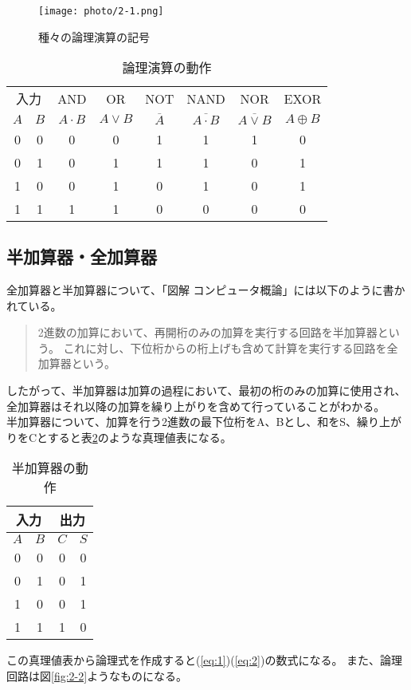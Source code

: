 \documentclass[dvipdfmx]{jsarticle}
\begin{document}
\begin{figure}[hbtp]
  \begin{center}
    \texttt{[image: photo/2-1.png]}
  \end{center}
  \caption{種々の論理演算の記号}
  \label{fig:2-1}
\end{figure}

\begin{table}[hbtp]
  \caption{論理演算の動作}
  \centering
  \begin{tabular}{|cc||c|c|c|c|c|c|} \hline
    \multicolumn{2}{|c||}{入力} & AND & OR & NOT & NAND & NOR & EXOR \\
    $A$ & $B$ & $A \cdot B$ & $A \vee B$ & $\overline{A}$ & $\overline{A \cdot B}$ & $\overline{A \vee B}$ & $A \oplus B$ \\ \hline
    0 & 0 & 0 & 0 & 1 & 1 & 1 & 0 \\ \hline
    0 & 1 & 0 & 1 & 1 & 1 & 0 & 1 \\ \hline
    1 & 0 & 0 & 1 & 0 & 1 & 0 & 1 \\ \hline
    1 & 1 & 1 & 1 & 0 & 0 & 0 & 0 \\ \hline
  \end{tabular}
  \label{tb:2-1}
\end{table}

\subsection{半加算器・全加算器}
全加算器と半加算器について、「図解 コンピュータ概論」\cite[p.98]{computer}には以下のように書かれている。
\begin{quote}
  2進数の加算において、再開桁のみの加算を実行する回路を半加算器という。
  これに対し、下位桁からの桁上げも含めて計算を実行する回路を全加算器という。
\end{quote}
したがって、半加算器は加算の過程において、最初の桁のみの加算に使用され、
全加算器はそれ以降の加算を繰り上がりを含めて行っていることがわかる。\\
半加算器について、加算を行う2進数の最下位桁をA、Bとし、和をS、繰り上がりをCとすると表\ref{tb:2-2}のような真理値表になる。\\
\begin{table}[hbtp]
  \caption{半加算器の動作}
  \centering
  \begin{tabular}{|c|c||c|c|} \hline
    \multicolumn{2}{|c||}{入力} & \multicolumn{2}{c|}{出力} \\ \hline
    $A$ & $B$ & $C$ & $S$ \\ \hline
    0 & 0 & 0 & 0 \\ \hline
    0 & 1 & 0 & 1 \\ \hline
    1 & 0 & 0 & 1 \\ \hline
    1 & 1 & 1 & 0 \\ \hline
  \end{tabular}
  \label{tb:2-2}
\end{table}
この真理値表から論理式を作成すると(\ref*{eq:1})(\ref*{eq:2})の数式になる。
また、論理回路は図\ref*{fig:2-2}ようなものになる。\\
\end{document}
